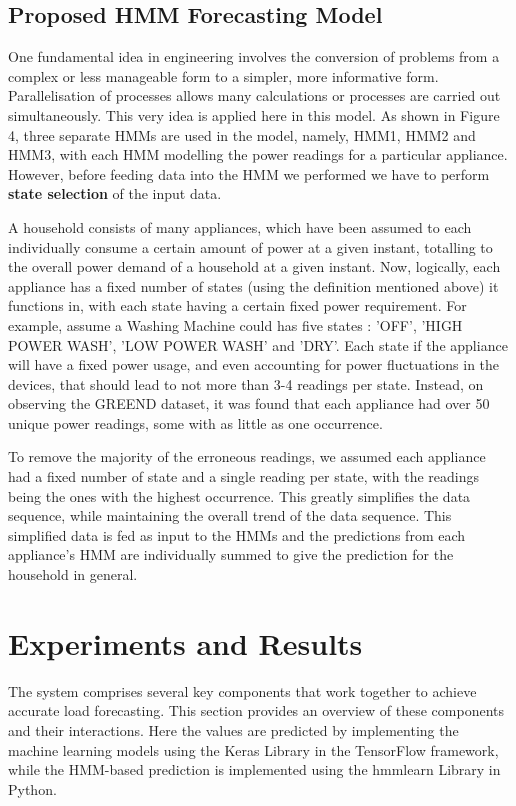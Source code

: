 \documentclass[conference]{IEEEtran}
\begin{document}
\subsection{Proposed HMM Forecasting Model}
One fundamental idea in engineering involves the conversion of problems from a complex or less manageable form to a simpler, more informative form. Parallelisation of processes allows many calculations or processes are carried out simultaneously. This very idea is applied here in this model. As shown in Figure 4, three separate HMMs are used in the model, namely, HMM1, HMM2 and HMM3, with each HMM modelling the power readings for a particular appliance. However, before feeding data into the HMM we performed we have to perform \textbf{state selection} of the input data. 

A household consists of many appliances, which have been assumed to each individually consume a certain amount of power at a given instant, totalling to the overall power demand of a household at a given instant. Now, logically, each appliance has a fixed number of states (using the definition mentioned above) it functions in, with each state having a certain fixed power requirement. For example, assume a Washing Machine could has five states : 'OFF', 'HIGH POWER WASH', 'LOW POWER WASH' and 'DRY'. Each state if the appliance will have a fixed power usage, and even accounting for power fluctuations in the devices, that should lead to not more than 3-4 readings per state. Instead, on observing the GREEND dataset, it was found that each appliance had over 50 unique power readings, some with as little as one occurrence. 

To remove the majority of the erroneous readings, we assumed each appliance had a fixed number of state and a single reading per state, with the readings being the ones with the highest occurrence. This greatly simplifies the data sequence, while maintaining the overall trend of the data sequence. This simplified data is fed as input to the HMMs and the predictions from each appliance's HMM are individually summed to give the prediction for the household in general.

\section{Experiments and Results}
The system comprises several key components that work together to achieve accurate load forecasting. This section provides an overview of these components and their interactions. Here the values are predicted by implementing the machine learning models using the Keras Library in the TensorFlow framework, while the HMM-based prediction is implemented using the hmmlearn Library in Python. 
\end{document}
